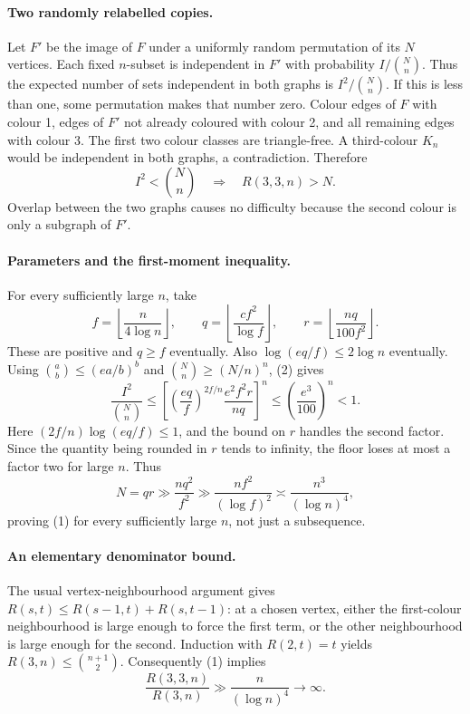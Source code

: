 \paragraph{Two randomly relabelled copies.}
Let \(F'\) be the image of \(F\) under a uniformly random permutation
of its \(N\) vertices. Each fixed \(n\)-subset is independent in
\(F'\) with probability \(I/\binom Nn\).
Thus the expected number of sets independent in both graphs is
\(I^2/\binom Nn\). If this is less than one, some permutation makes
that number zero.
Colour edges of \(F\) with colour 1, edges of \(F'\) not already
coloured with colour 2, and all remaining edges with colour 3.
The first two colour classes are triangle-free. A third-colour
\(K_n\) would be independent in both graphs, a contradiction.
Therefore
\[
 I^2<\binom Nn\quad\Longrightarrow\quad R(3,3,n)>N. \tag{3}
\]
Overlap between the two graphs causes no difficulty because the
second colour is only a subgraph of \(F'\).

\paragraph{Parameters and the first-moment inequality.}
For every sufficiently large \(n\), take
\[
 f=\left\lfloor\frac{n}{4\log n}\right\rfloor,\qquad
 q=\left\lfloor\frac{cf^2}{\log f}\right\rfloor,\qquad
 r=\left\lfloor\frac{nq}{100f^2}\right\rfloor.
\]
These are positive and \(q\geq f\) eventually. Also
\(\log(eq/f)\leq2\log n\) eventually.
Using \(\binom ab\leq(ea/b)^b\) and
\(\binom Nn\geq(N/n)^n\), (2) gives
\[
 \frac{I^2}{\binom Nn}
 \leq\left[
 \left(\frac{eq}{f}\right)^{2f/n}
 \frac{e^2f^2r}{nq}\right]^n
 \leq\left(\frac{e^3}{100}\right)^n<1. \tag{4}
\]
Here \((2f/n)\log(eq/f)\leq1\), and the bound on \(r\)
handles the second factor. Since the quantity being rounded in
\(r\) tends to infinity, the floor loses at most a factor two for
large \(n\). Thus
\[
 N=qr\gg\frac{nq^2}{f^2}
 \gg\frac{nf^2}{(\log f)^2}
 \asymp\frac{n^3}{(\log n)^4},
\]
proving (1) for every sufficiently large \(n\), not just a subsequence.

\paragraph{An elementary denominator bound.}
The usual vertex-neighbourhood argument gives
\(R(s,t)\leq R(s-1,t)+R(s,t-1)\): at a chosen vertex, either
the first-colour neighbourhood is large enough to force the first
term, or the other neighbourhood is large enough for the second.
Induction with \(R(2,t)=t\) yields
\(R(3,n)\leq\binom{n+1}{2}\).
Consequently (1) implies
\[
 \frac{R(3,3,n)}{R(3,n)}
 \gg\frac{n}{(\log n)^4}\longrightarrow\infty.
\]

